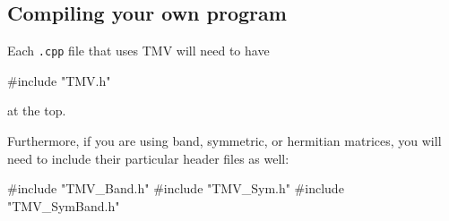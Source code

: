 \subsection{Compiling your own program}

Each \texttt{.cpp} file that uses TMV will need to have 
\begin{tmvcode}
#include "TMV.h"
\end{tmvcode}
at the top.

Furthermore, if you are using band, symmetric, or hermitian matrices, you
will need to include their particular header files as well:
\begin{tmvcode}
#include "TMV_Band.h"
#include "TMV_Sym.h"
#include "TMV_SymBand.h"
\end{tmvcode}

